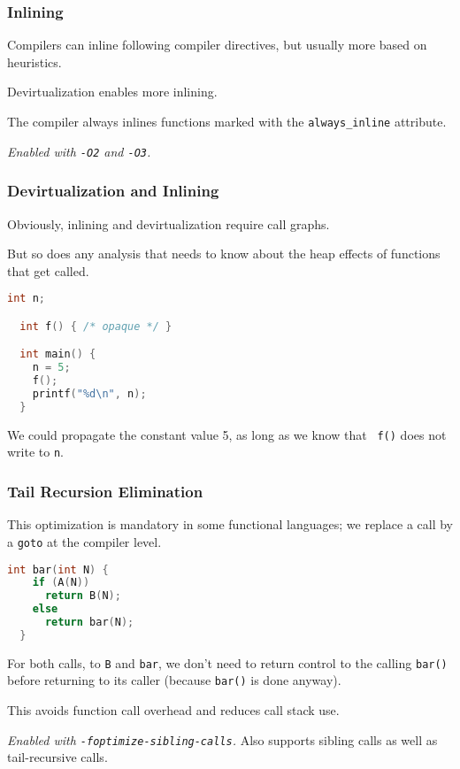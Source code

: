 \begin{frame}
\frametitle{Inlining}

 Compilers can inline following compiler directives, but usually more based on heuristics. 
 
 Devirtualization enables more inlining. 
 
 The compiler always inlines functions marked with the {\tt always\_inline} attribute.

\noindent \emph{Enabled with {\tt -O2} and {\tt -O3}.}



\end{frame}

\begin{frame}[fragile]
\frametitle{Devirtualization and Inlining}

Obviously, inlining and devirtualization require call graphs. 

But so
does any analysis that needs to know about the heap effects of
functions that get called.


\begin{lstlisting}[language=C]
  int n;

  int f() { /* opaque */ }

  int main() {
    n = 5;
    f();
    printf("%d\n", n);
  }
\end{lstlisting}

We could propagate the constant value 5, as long as we know that {\tt
  f()} does not write to {\tt n}.


\end{frame}

\begin{frame}[fragile]
\frametitle{Tail Recursion Elimination}

This optimization is mandatory in some functional languages; we replace a call by a {\tt goto} at the compiler level.

{\small
\begin{lstlisting}[language=C]
  int bar(int N) {
    if (A(N))
      return B(N);
    else
      return bar(N);
  }
\end{lstlisting}
}

For both calls, to {\tt B} and {\tt bar}, we don't need to return control
to the calling {\tt bar()} before returning to its caller (because {\tt bar()}
is done anyway). 

This avoids function call overhead and reduces call stack use.

\noindent \emph{Enabled with {\tt -foptimize-sibling-calls}.} Also supports
sibling calls as well as tail-recursive calls.

\end{frame}

